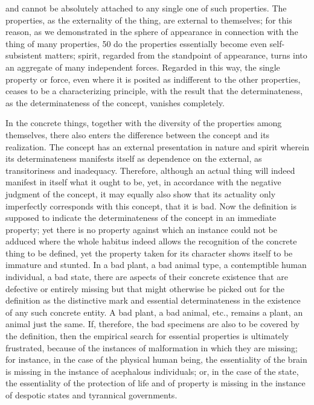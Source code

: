 and cannot be absolutely attached to any single one of such properties. The
properties, as the externality of the thing, are external to themselves; for this
reason, as we demonstrated in the sphere of appearance in connection with
the thing of many properties, 50 do the properties essentially become even
self-subsistent matters; spirit, regarded from the standpoint of appearance,
turns into an aggregate of many independent forces. Regarded in this way,
the single property or force, even where it is posited as indifferent to the
other properties, ceases to be a characterizing principle, with the result
that the determinateness, as the determinateness of the concept, vanishes
completely.

In the concrete things, together with the diversity of the properties
among themselves, there also enters the difference between the concept and
its realization. The concept has an external presentation in nature and
spirit wherein its determinateness manifests itself as dependence on the
external, as transitoriness and inadequacy. Therefore, although an actual
thing will indeed manifest in itself what it ought to be, yet, in accordance
with the negative judgment of the concept, it may equally also show that
its actuality only imperfectly corresponds with this concept, that it is bad.
Now the definition is supposed to indicate the determinateness of the
concept in an immediate property; yet there is no property against which
an instance could not be adduced where the whole habitus indeed allows
the recognition of the concrete thing to be defined, yet the property taken
for its character shows itself to be immature and stunted. In a bad plant, a
bad animal type, a contemptible human individual, a bad state, there are
aspects of their concrete existence that are defective or entirely missing but
that might otherwise be picked out for the definition as the distinctive mark
and essential determinateness in the existence of any such concrete entity.
A bad plant, a bad animal, etc., remains a plant, an animal just the same.
If, therefore, the bad specimens are also to be covered by the definition,
then the empirical search for essential properties is ultimately frustrated,
because of the instances of malformation in which they are missing; for
instance, in the case of the physical human being, the essentiality of the
brain is missing in the instance of acephalous individuals; or, in the case
of the state, the essentiality of the protection of life and of property is
missing in the instance of despotic states and tyrannical governments.

